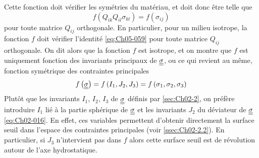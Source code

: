 Cette fonction doit vérifier les symétries du matériau, et doit donc être telle que 
\begin{equation}
    f \left( Q_{ik} Q_{il} \sigma_{kl} \right) = f \left( \sigma_{ij} \right)
    \label{eq:Ch05-059}
\end{equation}
pour toute matrice $Q_{ij}$ orthogonale.
En particulier, pour un milieu isotrope, la fonction $f$ doit vérifier l'identité \eqref{eq:Ch05-059} pour toute matrice $Q_{ij}$ orthogonale.
On dit alors que la fonction $f$ est isotrope, et on montre que $f$ est uniquement fonction des invariants principaux de $\underline{\underline{\sigma}}$, ou ce qui revient au même, fonction symétrique des contraintes principales 
\begin{equation}
    f\left( \underline{\underline{\sigma}} \right) = f \left( I_1, J_2, J_3 \right) = f\left( \sigma_1, \sigma_2, \sigma_3 \right)
    \label{eq:Ch05-060}
\end{equation}
Plutôt que les invariants $I_1$, $I_2$, $I_3$ de $\underline{\underline{\sigma}}$ définis par \ref{sec:Ch02-2}, on préfère introduire $I_1$ lié à la partie sphérique de $\underline{\underline{\sigma}}$ et les invariants $J_2$ du déviateur de $\underline{\underline{\sigma}}$ \eqref{eq:Ch02-016}.
En effet, ces variables permettent d'obtenir directement la surface seuil dans l'espace des contraintes principales (voir \ref{ssec:Ch02-2.2}).
En particulier, si $J_3$ n'intervient pas dans $f$ alors cette surface seuil est de révolution autour de l'axe hydrostatique.

